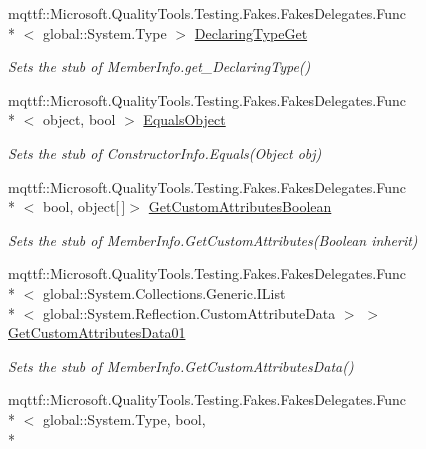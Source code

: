 \begin{DoxyCompactItemize}
mqttf\-::\-Microsoft.\-Quality\-Tools.\-Testing.\-Fakes.\-Fakes\-Delegates.\-Func\\*
$<$ global\-::\-System.\-Type $>$ \hyperlink{class_system_1_1_reflection_1_1_fakes_1_1_stub_constructor_info_a3f0d65d62430b51511fcb44f80809e95}{Declaring\-Type\-Get}
\begin{DoxyCompactList}\small\item\em Sets the stub of Member\-Info.\-get\-\_\-\-Declaring\-Type()\end{DoxyCompactList}\item 
mqttf\-::\-Microsoft.\-Quality\-Tools.\-Testing.\-Fakes.\-Fakes\-Delegates.\-Func\\*
$<$ object, bool $>$ \hyperlink{class_system_1_1_reflection_1_1_fakes_1_1_stub_constructor_info_a87cfa8b70295b5901acdc5f630292be7}{Equals\-Object}
\begin{DoxyCompactList}\small\item\em Sets the stub of Constructor\-Info.\-Equals(\-Object obj)\end{DoxyCompactList}\item 
mqttf\-::\-Microsoft.\-Quality\-Tools.\-Testing.\-Fakes.\-Fakes\-Delegates.\-Func\\*
$<$ bool, object\mbox{[}$\,$\mbox{]}$>$ \hyperlink{class_system_1_1_reflection_1_1_fakes_1_1_stub_constructor_info_aeec138d85b3206c6511147ffa44aec88}{Get\-Custom\-Attributes\-Boolean}
\begin{DoxyCompactList}\small\item\em Sets the stub of Member\-Info.\-Get\-Custom\-Attributes(\-Boolean inherit)\end{DoxyCompactList}\item 
mqttf\-::\-Microsoft.\-Quality\-Tools.\-Testing.\-Fakes.\-Fakes\-Delegates.\-Func\\*
$<$ global\-::\-System.\-Collections.\-Generic.\-I\-List\\*
$<$ global\-::\-System.\-Reflection.\-Custom\-Attribute\-Data $>$ $>$ \hyperlink{class_system_1_1_reflection_1_1_fakes_1_1_stub_constructor_info_aa0da5e4f9361370580c3606469288a9d}{Get\-Custom\-Attributes\-Data01}
\begin{DoxyCompactList}\small\item\em Sets the stub of Member\-Info.\-Get\-Custom\-Attributes\-Data()\end{DoxyCompactList}\item 
mqttf\-::\-Microsoft.\-Quality\-Tools.\-Testing.\-Fakes.\-Fakes\-Delegates.\-Func\\*
$<$ global\-::\-System.\-Type, bool, \\*

\end{DoxyCompactItemize}
